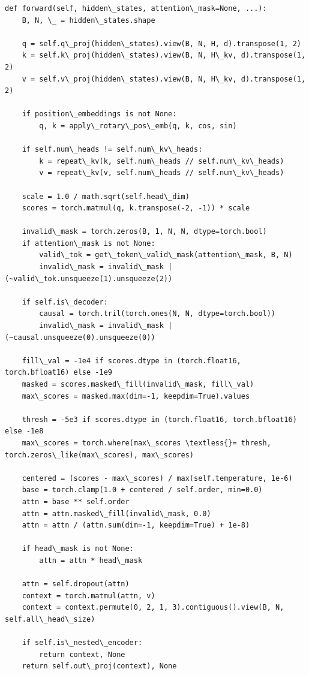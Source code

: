 \begin{lstlisting}
def forward(self, hidden\_states, attention\_mask=None, ...):
    B, N, \_ = hidden\_states.shape
    
    q = self.q\_proj(hidden\_states).view(B, N, H, d).transpose(1, 2)
    k = self.k\_proj(hidden\_states).view(B, N, H\_kv, d).transpose(1, 2)
    v = self.v\_proj(hidden\_states).view(B, N, H\_kv, d).transpose(1, 2)
    
    if position\_embeddings is not None:
        q, k = apply\_rotary\_pos\_emb(q, k, cos, sin)
    
    if self.num\_heads != self.num\_kv\_heads:
        k = repeat\_kv(k, self.num\_heads // self.num\_kv\_heads)
        v = repeat\_kv(v, self.num\_heads // self.num\_kv\_heads)
    
    scale = 1.0 / math.sqrt(self.head\_dim)
    scores = torch.matmul(q, k.transpose(-2, -1)) * scale
    
    invalid\_mask = torch.zeros(B, 1, N, N, dtype=torch.bool)
    if attention\_mask is not None:
        valid\_tok = get\_token\_valid\_mask(attention\_mask, B, N)
        invalid\_mask = invalid\_mask | (~valid\_tok.unsqueeze(1).unsqueeze(2))
    
    if self.is\_decoder:
        causal = torch.tril(torch.ones(N, N, dtype=torch.bool))
        invalid\_mask = invalid\_mask | (~causal.unsqueeze(0).unsqueeze(0))
    
    fill\_val = -1e4 if scores.dtype in (torch.float16, torch.bfloat16) else -1e9
    masked = scores.masked\_fill(invalid\_mask, fill\_val)
    max\_scores = masked.max(dim=-1, keepdim=True).values
    
    thresh = -5e3 if scores.dtype in (torch.float16, torch.bfloat16) else -1e8
    max\_scores = torch.where(max\_scores \textless{}= thresh, torch.zeros\_like(max\_scores), max\_scores)
    
    centered = (scores - max\_scores) / max(self.temperature, 1e-6)
    base = torch.clamp(1.0 + centered / self.order, min=0.0)
    attn = base ** self.order
    attn = attn.masked\_fill(invalid\_mask, 0.0)
    attn = attn / (attn.sum(dim=-1, keepdim=True) + 1e-8)
    
    if head\_mask is not None:
        attn = attn * head\_mask
    
    attn = self.dropout(attn)
    context = torch.matmul(attn, v)
    context = context.permute(0, 2, 1, 3).contiguous().view(B, N, self.all\_head\_size)
    
    if self.is\_nested\_encoder:
        return context, None
    return self.out\_proj(context), None
\end{lstlisting}

